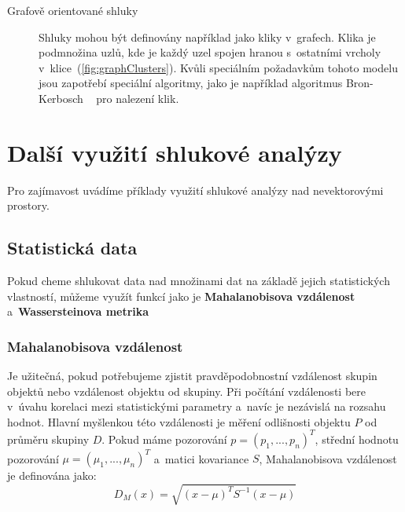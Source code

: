 \begin{description}
\item[Grafově orientované shluky] Shluky mohou být definovány například jako kli\-ky v~grafech. Klika je podmnožina uzlů, kde je každý uzel spojen hranou s~ostatními vrcholy v~klice~(\autoref{fig:graphClusters}).
Kvůli speciálním požadavkům tohoto modelu jsou zapotřebí speciální algoritmy, jako je například algoritmus Bron-Kerbosch ~\cite{Sun15} pro nalezení klik.
\end{description}

\section{Další využití shlukové analýzy} \label{sec:otherdata}
Pro zajímavost uvádíme příklady využití shlukové analýzy nad nevektorovými prostory.

\subsection{Statistická data}
Pokud cheme shlukovat data nad množinami dat na základě jejich statistických vlastností, můžeme využít funkcí jako je \textbf{Mahalanobisova vzdálenost} a~\textbf{Wassersteinova metrika}

\subsubsection{Mahalanobisova vzdálenost}
Je užitečná, pokud potřebujeme zjistit pravděpodobnostní vzdálenost skupin objektů nebo vzdálenost objektu od skupiny. Při počítání vzdálenosti bere v~úvahu korelaci mezi statistickými parametry a~navíc je nezávislá na rozsahu hodnot. Hlavní myšlenkou této vzdálenosti je měření odlišnosti objektu $P$ od průměru skupiny $D$.
Pokud máme pozorování $p = (p_1,..., p_n)^T$, střední hodnotu pozorování $\mu=(\mu_1,...,\mu_n)^T $ a~matici kovariance $S$, Mahalanobisova vzdálenost je definována jako:
$$D_M(x) = \sqrt{(x - \mu)^T S^{-1} (x-\mu)}$$

